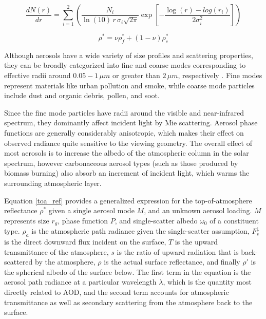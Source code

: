 \documentclass[12pt]{article}
\begin{document}
\begin{equation}\label{size_dist}
    \frac{dN(r)}{dr} = \sum_{i=1}^2\left(\frac{N_i}{\ln(10)\,r\,\sigma_i \sqrt{2\pi}}\exp\left[-\frac{\log(r)-log(r_i)}{2\sigma_i^2}\right]\right)
\end{equation}

\begin{equation}\label{mode_ratio}
    \rho^* = \nu \rho^*_f + (1-\nu)\rho^*_c
\end{equation}

Although aerosols have a wide variety of size profiles and scattering properties, they can be broadly categorized into fine and coarse modes corresponding to effective radii around $0.05-1\,\si{\mu m}$ or greater than $2\,\si{\mu m}$, respectively \cite{tanre_remote_1997}\cite{kaufman_satellite_2002}. Fine modes represent materials like urban pollution and smoke, while coarse mode particles include dust and organic debris, pollen, and soot.

Since the fine mode particles have radii around the visible and near-infrared spectrum, they dominantly affect incident light by Mie scattering. Aerosol phase functions are generally considerably anisotropic, which makes their effect on observed radiance quite sensitive to the viewing geometry. The overall effect of most aerosols is to increase the albedo of the atmospheric column in the solar spectrum, however carbonaceous aerosol types (such as those produced by biomass burning) also absorb an increment of incident light, which warms the surrounding atmospheric layer.

Equation \ref{toa_ref} provides a generalized expression for the top-of-atmosphere reflectance $\rho^*$ given a single aerosol mode $M$, and an unknown aerosol loading. $M$ represents size $r_g$, phase function $P$, and single-scatter albedo $\omega_0$ of a constituent type. $\rho_a$ is the atmospheric path radiance given the single-scatter assumption, $F_s^\downarrow$ is the direct downward flux incident on the surface, $T$ is the upward transmittance of the atmosphere, $s$ is the ratio of upward radiation that is back-scattered by the atmosphere, $\rho$ is the actual surface reflectance, and finally $\rho'$ is the spherical albedo of the surface below. The first term in the equation is the aerosol path radiance at a particular wavelength $\lambda$, which is the quantity most directly related to AOD, and the second term accounts for atmospheric transmittance as well as secondary scattering from the atmosphere back to the surface.
\end{document}
